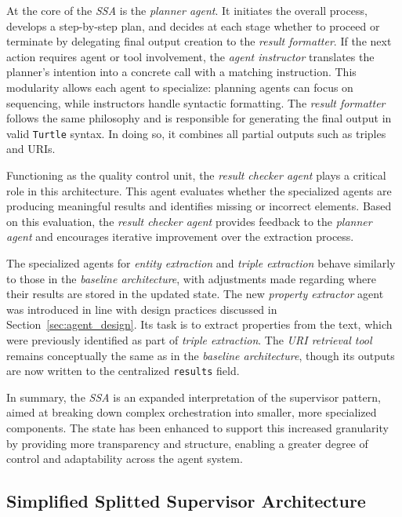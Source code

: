\documentclass[a4paper,oneside,bibliography=totoc]{scrbook}
\begin{document}
At the core of the \textit{\ac{SSA}} is the \textit{planner agent}. It initiates the overall process, develops a step-by-step plan, and decides at each stage whether to proceed or terminate by delegating final output creation to the \textit{result formatter}. If the next action requires agent or tool involvement, the \textit{agent instructor} translates the planner's intention into a concrete call with a matching instruction. This modularity allows each agent to specialize: planning agents can focus on sequencing, while instructors handle syntactic formatting. The \textit{result formatter} follows the same philosophy and is responsible for generating the final output in valid \texttt{Turtle} syntax. In doing so, it combines all partial outputs such as triples and \acp{URI}.

Functioning as the quality control unit, the \textit{result checker agent} plays a critical role in this architecture. This agent evaluates whether the specialized agents are producing meaningful results and identifies missing or incorrect elements. Based on this evaluation, the \textit{result checker agent} provides feedback to the \textit{planner agent} and encourages iterative improvement over the extraction process.

The specialized agents for \textit{entity extraction} and \textit{triple extraction} behave similarly to those in the \textit{baseline architecture}, with adjustments made regarding where their results are stored in the updated state. The new \textit{property extractor} agent was introduced in line with design practices discussed in Section~\ref{sec:agent_design}. Its task is to extract properties from the text, which were previously identified as part of \textit{triple extraction}. The \textit{\ac{URI} retrieval tool} remains conceptually the same as in the \textit{baseline architecture}, though its outputs are now written to the centralized \texttt{results} field.

In summary, the \textit{\ac{SSA}} is an expanded interpretation of the supervisor pattern, aimed at breaking down complex orchestration into smaller, more specialized components. The state has been enhanced to support this increased granularity by providing more transparency and structure, enabling a greater degree of control and adaptability across the agent system.

\subsection{Simplified Splitted Supervisor Architecture}
\label{subsec:simplified_splitted_supervisor}
\end{document}
